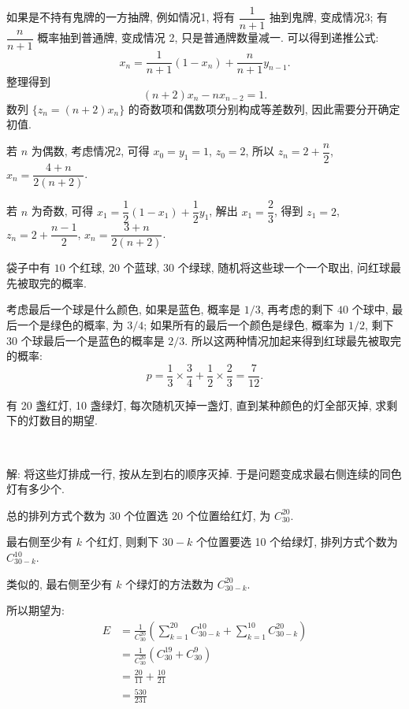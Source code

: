 如果是不持有鬼牌的一方抽牌, 例如情况1, 将有 $\dfrac{1}{n+1}$ 抽到鬼牌, 变成情况3; 有 $\dfrac{n}{n+1}$ 概率抽到普通牌, 变成情况 2, 只是普通牌数量减一.
可以得到递推公式:
\[ x_n = \frac{1}{n+1}(1-x_n) + \frac{n}{n+1}y_{n-1}  .\]
整理得到
\[(n+2)x_n - nx_{n-2} = 1.\]
数列 $\{z_n = (n+2)x_n\}$ 的奇数项和偶数项分别构成等差数列, 因此需要分开确定初值.

若 $n$ 为偶数, 考虑情况2, 可得 $x_0 = y_1 = 1$, $z_0 = 2$, 所以 $z_n = 2+\dfrac{n}{2}$, $x_n = \dfrac{4+n}{2(n+2)}$.

若 $n$ 为奇数, 可得 $x_1 = \dfrac{1}{2}(1-x_1)+\dfrac{1}{2}y_1$, 解出 $x_1 = \dfrac{2}{3}$, 得到 $z_1 = 2$, $z_n = 2+\dfrac{n-1}{2}$, $x_n = \dfrac{3+n}{2(n+2)}$.

\newpage

袋子中有 $ 10 $ 个红球, $ 20 $ 个蓝球, $ 30 $ 个绿球, 随机将这些球一个一个取出, 问红球最先被取完的概率.

考虑最后一个球是什么颜色, 如果是蓝色, 概率是 $ 1/3 $, 再考虑的剩下 $ 40 $ 个球中, 最后一个是绿色的概率, 为 $ 3/4 $; 如果所有的最后一个颜色是绿色, 概率为 $ 1/2 $, 剩下 $ 30 $ 个球最后一个是蓝色的概率是 $ 2/3 $. 所以这两种情况加起来得到红球最先被取完的概率: 
\[ p = \frac{1}{3} \times \frac{3}{4} + \frac{1}{2} \times \frac{2}{3} = \frac{7}{12} .\]


\newpage

有 20 盏红灯, 10 盏绿灯, 每次随机灭掉一盏灯, 直到某种颜色的灯全部灭掉, 求剩下的灯数目的期望.

~

解: 将这些灯排成一行, 按从左到右的顺序灭掉. 于是问题变成求最右侧连续的同色灯有多少个.

总的排列方式个数为 30 个位置选 20 个位置给红灯, 为 $C_{30}^{20}$. 

最右侧至少有 $k$ 个红灯, 则剩下 $30-k$ 个位置要选 10 个给绿灯, 排列方式个数为 $C_{30-k}^{10}$.

类似的, 最右侧至少有 $k$ 个绿灯的方法数为 $C_{30-k}^{20}$.

所以期望为:
\begin{align*}
E &= \frac{1}{C_{30}^{20}}(\sum_{k=1}^{20}C_{30-k}^{10} + \sum_{k=1}^{10}C_{30-k}^{20}) \\
&= \frac{1}{C_{30}^{20}}(C_{30}^{19}+C_{30}^9) \\
&= \frac{20}{11} + \frac{10}{21}\\
&= \frac{530}{231}
\end{align*}

